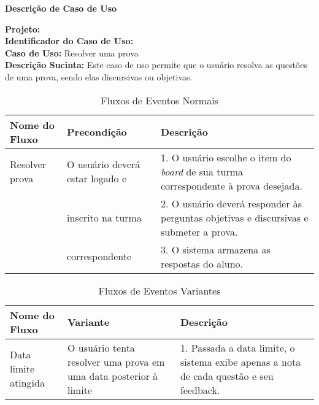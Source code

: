 \newpage
\clearpage
\begin{flushright}    \textbf{Descrição de Caso de Uso}   \end{flushright}         
\noindent \textbf{Projeto:} \imprimirtitulo  \\
\textbf{Identificador do Caso de Uso:} \UC\label{uc-resolver-prova} \\
\textbf{Caso de Uso:} Resolver uma prova \\
\noindent \textbf{Descrição Sucinta:} Este caso de uso permite que o usuário resolva as questões de uma prova, sendo elas discursivas ou objetivas.\\

\begin{table}[H]
	\centering \vspace{0.5cm} \footnotesize
	\caption{Fluxos de Eventos Normais}
	\begin{tabular}{|p{2.3cm}|p{2.5cm}|p{10cm}|} \hline  \rowcolor[rgb]{0.8,0.8,0.8}
		
		Nome do Fluxo & Precondição & Descrição  \\ \hline		
		
		Resolver  prova & O usuário  deverá estar logado e& 1. O usuário escolhe o item do \textit{board} de sua turma correspondente à prova desejada.  \\
		{}    &  inscrito na turma  & 2. O usuário deverá responder às perguntas objetivas e discursivas e submeter a prova.\\
		{}    &  correspondente & 3. O sistema armazena as respostas do aluno.\\ \hline
		
		
	\end{tabular}
\end{table}


\begin{table}[H]
	\centering \vspace{0.5cm} \footnotesize
	\caption{Fluxos de Eventos Variantes}
	\begin{tabular}{|p{2.3cm}|p{2.5cm}|p{10.0cm}|} \hline  \rowcolor[rgb]{0.8,0.8,0.8}
		
		Nome do Fluxo & Variante & Descrição  \\ \hline		
		
		Data limite atingida & O usuário tenta resolver uma prova em uma data posterior à limite & 1. Passada a data limite, o sistema exibe apenas a nota de cada questão e seu feedback.  \\ \hline 
		
	\end{tabular}
\end{table}


